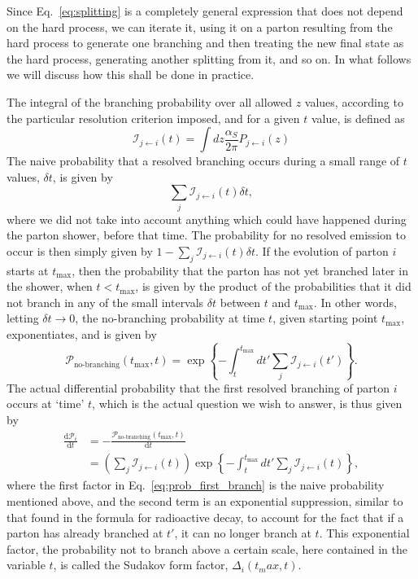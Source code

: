 Since Eq.~\ref{eq:splitting} is a completely general expression that does not depend on the hard
process, we can iterate it, using it on a parton resulting from the hard process to generate
one branching and then treating the new final state as the hard process, generating another
splitting from it, and so on. In what follows we will discuss how this shall be done in practice.

The integral of the branching probability over all allowed $z$ values, according to the
particular resolution criterion imposed, and for a given $t$ value, is defined as
\begin{equation}
  \mathcal{I}_{j\leftarrow i}(t) = \int dz \frac{\alpha_S}{2\pi} P_{j\leftarrow i}(z)
\end{equation}
The naive probability that a resolved branching occurs during a small range of $t$ values, $\delta
t$, is given by 
\begin{equation}
 \sum_j \mathcal{I}_{j\leftarrow i}(t) \delta t,
\end{equation}
where we did not take into account anything which could have happened during the parton shower,
before that time. The probability for no resolved emission to occur is then simply given by $1 -
\sum_j \mathcal{I}_{j\leftarrow i}(t) \delta t$. 
If the evolution of parton $i$ starts at $t_{\text{max}}$, then the probability that the parton
has not yet branched later in the shower, when $t < t_{\text{max}}$, is given by
the product of the probabilities that it did not branch in any of the small intervals $\delta t$
between $t$ and $t_{\text{max}}$. In other words, letting $\delta t \rightarrow 0$, the no-branching
probability at time $t$, given starting point $t_{\text{max}}$, exponentiates, and is given by
\begin{equation}
  \mathcal{P}_{\text{no-branching}}(t_{\text{max}},t) = \exp 
  \left\{ - \int_t^{t_{\text{max}}} dt' \sum_j \mathcal{I}_{j\leftarrow i}(t') \right\} .
\end{equation}
The actual differential probability that the first resolved branching of parton $i$ occurs at `time'
$t$, which is the actual question we wish to answer, is thus given by
\begin{align}
  \frac{\text{d}\mathcal{P}_i}{\text{d}t} &= -
\frac{\mathcal{P}_{\text{no-branching}}(t_{\text{max}},t)}{\text{d}t} \\
 &= \left( \sum_j \mathcal{I}_{j\leftarrow i}(t)\right) \exp \left\{ - \int_t^{t_{\text{max}}} dt'
\sum_j \mathcal{I}_{j\leftarrow i}(t) \right\}, \label{eq:prob_first_branch}
\end{align}
where the first factor in Eq.~\ref{eq:prob_first_branch} is the naive probability mentioned above,
and the second term is an exponential suppression, similar to that found in the formula for
radioactive decay, to account for the fact that if a parton has already branched at $t'$, it can no
longer branch at $t$. 
This exponential factor, the probability not to branch above a certain scale, here
contained in the variable $t$, is called the Sudakov form factor, $\Delta_i(t_max,t)$. 

